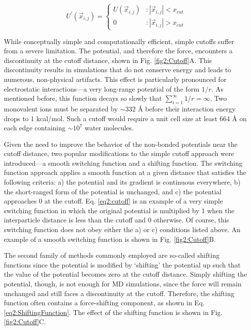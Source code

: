 \begin{equation}
   U^{\prime}(\vec{x}_{i,j}) = \left \{
   \begin{array}{lr}
      U(\vec{x}_{i,j}) & : \left | \vec{x}_{i,j} \right | < x_{cut} \\
      0 & : \left | \vec{x}_{i,j} \right | > x_{cut}
   \end{array}
   \right.
   \label{eq2:cutoff}
\end{equation}

While conceptually simple and computationally efficient, simple cutoffs suffer
from a severe limitation. The potential, and therefore the force, encounters a
discontinuity at the cutoff distance, shown in Fig.
\ref{fig2:Cutoff}A. This discontinuity results in simulations that do not
conserve energy and leads to numerous, non-physical artifacts.
\cite{Schreiber_JMolBiol_1992_v228_p909, Schreiber_Biochemistry_1992_v31_p5856,
Saito_JChemPhys_1994_v101_p4055, Auffinger_ChemPhysLett_1995_v234_p413,
Cheatham_JAmChemSoc_1995_v117_p4193, Feller_JPhysChem_1996_v100_p17011,
Patra_BiophysJ_2003_v84_p3636} This effect is particularly pronounced for
electrostatic interactions---a very long-range potential of the form $1/r$. As
mentioned before, this function decays so slowly that $\sum_{i=1}^{\infty} 1/r =
\infty$.  Two monovalent ions must be separated by $\sim332$ {\AA} before their
interaction energy drops to 1 kcal/mol. Such a cutoff would require a unit cell
size at least 664 {\AA} on each edge containing $\sim 10^7$ water molecules.

Given the need to improve the behavior of the non-bonded potentials near the
cutoff distance, two popular modifications to the simple cutoff approach were
introduced---a smooth switching function and a shifting function. The switching
function approach applies a smooth function at a given distance that satisfies
the following criteria: a) the potential and its gradient is continuous
everywhere, b) the short-ranged form of the potential is unchanged, and c) the
potential approaches 0 at the cutoff. Eq. \ref{eq2:cutoff} is an example of a
very simple switching function in which the original potential is multiplied by
1 when the interparticle distance is less than the cutoff and 0 otherwise. Of
course, this switching function does not obey either the a) or c) conditions
listed above. An example of a smooth switching function is shown in Fig.
\ref{fig2:Cutoff}B. \cite{Steinbach_JComputChem_1994_v15_p667}

The second family of methods commonly employed are so-called shifting functions
since the potential is modified by `shifting' the potential up such that the
value of the potential becomes zero at the cutoff distance.
\cite{Steinbach_JComputChem_1994_v15_p667, Allen_Tildesley} Simply shifting the
potential, though, is not enough for MD simulations, since the force will remain
unchanged and still faces a discontinuity at the cutoff. Therefore, the shifting
function often contains a force-shifting component, as shown in Eq.
\ref{eq2:ShiftingFunction}. \cite{Allen_Tildesley} The effect of the shifting
function is shown in Fig. \ref{fig2:Cutoff}C.

